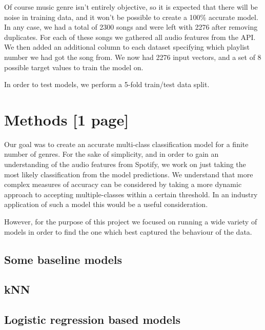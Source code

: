 \documentclass[12pt, a4]{article} %
\begin{document}
Of course music genre isn't entirely objective, so it is expected that there will be noise in training data, and it won't be possible to create a 100\% accurate model. In any case, we had a total of 2300 songs and were left with 2276 after removing duplicates. For each of these songs we gathered all audio features from the API. We then added an additional column to each dataset specifying which playlist number we had got the song from. We now had 2276 input vectors, and a set of 8 possible target values to train the model on.\newline

In order to test models, we perform a 5-fold train/test data split.\newline


\section{Methods [1 page]}
Our goal was to create an accurate multi-class classification model for a finite number of genres. For the sake of simplicity, and in order to gain an understanding of the audio features from Spotify, we work on just taking the most likely classification from the model predictions. We understand that more complex measures of accuracy can be considered by taking a more dynamic approach to accepting multiple-classes within a certain threshold. In an industry application of such a model this would be a useful consideration.\newline 

However, for the purpose of this project we focused on running a wide variety of models in order to find the one which best captured the behaviour of the data.



\subsection{Some baseline models}
\subsection{kNN}
\subsection{Logistic regression based models}
\end{document}
